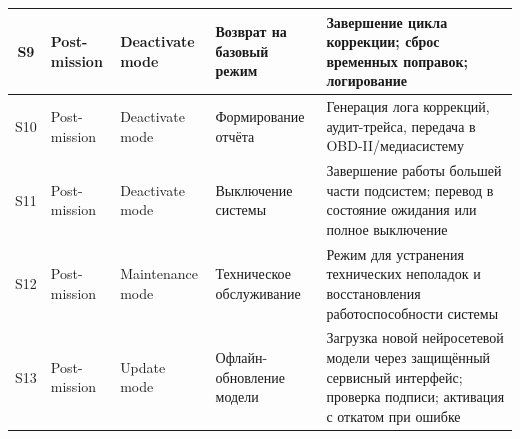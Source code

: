 \documentclass[14pt, a4paper]{extarticle}
\begin{document}
{\begin{xltabular}{\textwidth}{|c|L|L|L|L|}
						\hline
						S9 & Post-mission & Deactivate mode & Возврат на базовый режим & Завершение цикла коррекции; сброс временных поправок; логирование \\
						\hline
						S10 & Post-mission & Deactivate mode & Формирование отчёта & Генерация лога коррекций, аудит-трейса, передача в OBD-II/медиасистему \\
						\hline
						S11 & Post-mission & Deactivate mode & Выключение системы & Завершение работы большей части подсистем; перевод в состояние ожидания или полное выключение \\
						\hline
						S12 & Post-mission & Maintenance mode & Техническое обслуживание & Режим для устранения технических неполадок и восстановления работоспособности системы \\
						\hline
						S13 & Post-mission & Update mode & Офлайн-обновление модели & Загрузка новой нейросетевой модели через защищённый сервисный интерфейс; проверка подписи; активация с откатом при ошибке \\
						\hline
					\end{xltabular}}
				
\end{document}
